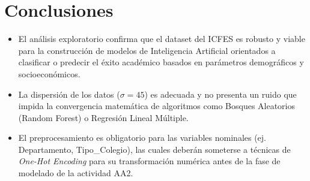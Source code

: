 \documentclass[12pt]{article}
\begin{document}
\section{Conclusiones}
\begin{itemize}
    \item El análisis exploratorio confirma que el dataset del ICFES es robusto y viable para la construcción de modelos de Inteligencia Artificial orientados a clasificar o predecir el éxito académico basados en parámetros demográficos y socioeconómicos.
    \item La dispersión de los datos ($\sigma = 45$) es adecuada y no presenta un ruido que impida la convergencia matemática de algoritmos como Bosques Aleatorios (Random Forest) o Regresión Lineal Múltiple.
    \item El preprocesamiento es obligatorio para las variables nominales (ej. Departamento, Tipo\_Colegio), las cuales deberán someterse a técnicas de \textit{One-Hot Encoding} para su transformación numérica antes de la fase de modelado de la actividad AA2.
\end{itemize}
\end{document}
